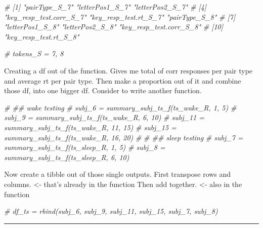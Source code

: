 \documentclass[]{article}
\newenvironment{Shaded}{\begin{snugshade}}{\end{snugshade}}
\newcommand{\CommentTok}[1]{\textcolor[rgb]{0.56,0.35,0.01}{\textit{#1}}}
\begin{document}
\begin{Shaded}
\begin{Highlighting}[]
\CommentTok{#  [1] "pairType_S_7"           "letterPos1_S_7"         "letterPos2_S_7"        }
\CommentTok{#  [4] "key_resp_test.corr_S_7" "key_resp_test.rt_S_7"   "pairType_S_8"          }
\CommentTok{#  [7] "letterPos1_S_8"         "letterPos2_S_8"         "key_resp_test.corr_S_8"}
\CommentTok{# [10] "key_resp_test.rt_S_8"  }

\CommentTok{# tokens_S = 7, 8}
\end{Highlighting}
\end{Shaded}

Creating a df out of the function. Gives me total of corr responses per
pair type and average rt per pair type. Then make a proportion out of it
and combine those df, into one bigger df. Consider to write another
function.

\begin{Shaded}
\begin{Highlighting}[]
\CommentTok{# ## wake testing}
\CommentTok{# subj_6 = summary_subj_ts_f(ts_wake_R, 1, 5)}
\CommentTok{# subj_9 = summary_subj_ts_f(ts_wake_R, 6, 10)}
\CommentTok{# subj_11 = summary_subj_ts_f(ts_wake_R, 11, 15)}
\CommentTok{# subj_15 = summary_subj_ts_f(ts_wake_R, 16, 20)}
\CommentTok{# }
\CommentTok{# ## sleep testing}
\CommentTok{# subj_7 = summary_subj_ts_f(ts_sleep_R, 1, 5)}
\CommentTok{# subj_8 = summary_subj_ts_f(ts_sleep_R, 6, 10)}
\end{Highlighting}
\end{Shaded}

Now create a tibble out of those single outputs. First transpose rows
and columns. \textless{}- that's already in the function Then add
together. \textless{}- also in the function

\begin{Shaded}
\begin{Highlighting}[]
\CommentTok{# df_ts = rbind(subj_6, subj_9, subj_11, subj_15, subj_7, subj_8)}
\end{Highlighting}
\end{Shaded}

\begin{center}\rule{0.5\linewidth}{0.5pt}\end{center}
\end{document}
